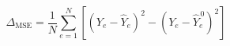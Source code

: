 \par\needspace{88pt}\begin{minipage}{\linewidth}
\begin{equation}\Delta_{\mathrm{MSE}}=\frac1N\sum_{e=1}^{N}\left[(Y_e-\widehat Y_e)^2-(Y_e-\widehat Y_e^{\,0})^2\right]\label{eq:15}\end{equation}
\end{minipage}\par
